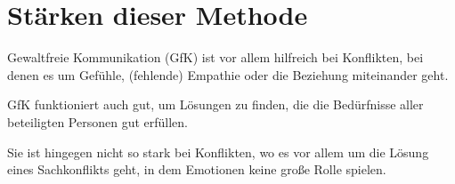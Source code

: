 \section{Stärken dieser Methode}

Gewaltfreie Kommunikation (GfK) ist vor allem hilfreich bei Konflikten, bei denen es um Gefühle, (fehlende) Empathie oder die Beziehung miteinander geht.

GfK funktioniert auch gut, um Lösungen zu finden, die die Bedürfnisse aller beteiligten Personen gut erfüllen.

Sie ist hingegen nicht so stark bei Konflikten, wo es vor allem um die Lösung eines Sachkonflikts geht, in dem Emotionen keine große Rolle spielen.
